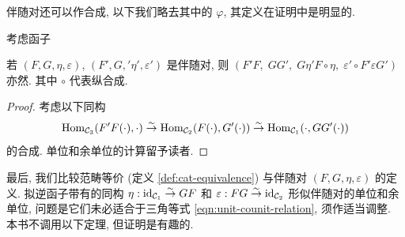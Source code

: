伴随对还可以作合成, 以下我们略去其中的 $\varphi$, 其定义在证明中是明显的.

\begin{proposition}\label{prop:adjunction-composition}
	考虑函子
	若 $(F, G, \eta, \varepsilon)$, $(F', G,' \eta', \varepsilon')$ 是伴随对, 则 $(F'F, \; GG', \; G \eta' F \circ \eta, \; \varepsilon' \circ F' \varepsilon G')$ 亦然. 其中 $\circ$ 代表纵合成.
\end{proposition}
\begin{proof}
	考虑以下同构
	\[ \operatorname{Hom}_{\mathcal{C}_3}(F'F(\cdot), \cdot) \stackrel{\sim}{\rightarrow} \operatorname{Hom}_{\mathcal{C}_2}(F(\cdot), G'(\cdot)) \stackrel{\sim}{\rightarrow} \operatorname{Hom}_{\mathcal{C}_1}(\cdot, GG'(\cdot)) \]
	的合成. 单位和余单位的计算留予读者.
\end{proof}

最后, 我们比较范畴等价 (定义 \ref{def:cat-equivalence}) 与伴随对 $(F, G, \eta, \varepsilon)$ 的定义. 拟逆函子带有的同构 $\eta: \mathrm{id}_{\mathcal{C}_1} \stackrel{\sim}{\rightarrow} GF$ 和 $\varepsilon: FG \stackrel{\sim}{\rightarrow} \mathrm{id}_{\mathcal{C}_2}$ 形似伴随对的单位和余单位, 问题是它们未必适合于三角等式 \eqref{eqn:unit-counit-relation}, 须作适当调整. 本书不调用以下定理, 但证明是有趣的.

